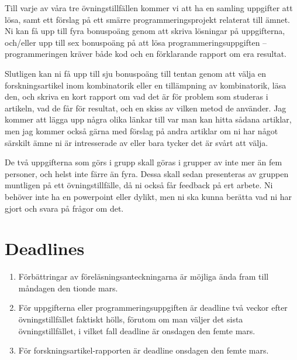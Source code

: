 \documentclass[nobib]{tufte-handout}
\begin{document}
Till varje av våra tre övningstillfällen kommer vi att ha en samling uppgifter att lösa, samt ett förslag på ett smärre programmeringsprojekt relaterat till ämnet. Ni kan få upp till fyra bonuspoäng genom att skriva lösningar på uppgifterna, och/eller upp till sex bonuspoäng på att lösa programmeringsuppgiften -- programmeringen kräver både kod och en förklarande rapport om era resultat.

Slutligen kan ni få upp till sju bonuspoäng till tentan genom att välja en forskningsartikel inom kombinatorik eller en tillämpning av kombinatorik, läsa den, och skriva en kort rapport om vad det är för problem som studeras i artikeln, vad de får för resultat, och en skiss av vilken metod de använder. Jag kommer att lägga upp några olika länkar till var man kan hitta sådana artiklar, men jag kommer också gärna med förslag på andra artiklar om ni har något särskilt ämne ni är intresserade av eller bara tycker det är svårt att välja.

De två uppgifterna som görs i grupp skall göras i grupper av inte mer än fem personer, och helst inte färre än fyra. Dessa skall sedan presenteras av gruppen muntligen på ett övningstillfälle, då ni också får feedback på ert arbete. Ni behöver inte ha en powerpoint eller dylikt, men ni ska kunna berätta vad ni har gjort och svara på frågor om det.

\section{Deadlines}

\begin{enumerate}
	\item Förbättringar av föreläsningsanteckningarna är möjliga ända fram till måndagen den tionde mars.
	\item För uppgifterna eller programmeringsuppgiften är deadline två veckor efter övningstillfället faktiskt hölls, förutom om man väljer det sista övningstillfället, i vilket fall deadline är onsdagen den femte mars.
	\item För forskningsartikel-rapporten är deadline onsdagen den femte mars.
\end{enumerate}
\end{document}
